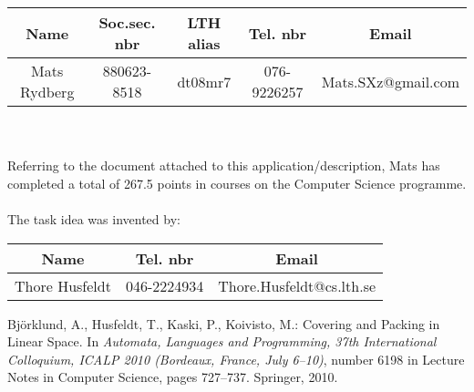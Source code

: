 \documentclass[a4paper, titlepage]{article}
\begin{document}
\begin{tabular}{c|c|c|c|c}
Name & Soc.sec. nbr & LTH alias & Tel. nbr & Email \\ \hline
Mats Rydberg & 880623-8518 & dt08mr7 & 076-9226257 & Mats.SXz@gmail.com \\
\end{tabular}
\\ \\
Referring to the document attached to this application/description, Mats has completed a total of 267.5 points in courses on the Computer Science programme.
\\ \\
The task idea was invented by:
\\

\begin{tabular}{c|c|c}
Name & Tel. nbr & Email \\ \hline
Thore Husfeldt & 046-2224934  & Thore.Husfeldt@cs.lth.se \\
\end{tabular}

\begin{thebibliography}{99}
 Björklund, A., Husfeldt, T., Kaski, P., Koivisto, M.: Covering and Packing in Linear Space. In \emph{Automata, Languages and Programming, 37th International Colloquium, ICALP 2010 (Bordeaux, France, July 6–10)}, number 6198 in Lecture Notes in Computer Science, pages 727–737. Springer, 2010.
\end{thebibliography}
\end{document}
